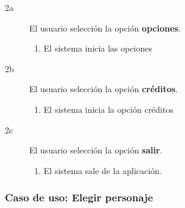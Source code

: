 \begin{description}
\begin{description}
            \item[2a ] El usuario selección la opción \textbf{opciones}.
            \begin{enumerate}
                \item El sistema inicia las opciones
            \end{enumerate}
            
            \item[2b ] El usuario selección la opción \textbf{créditos}.
            \begin{enumerate}
                \item El sistema inicia la opción créditos
            \end{enumerate}
            
            \item[2c ] El usuario selección la opción \textbf{salir}.
            \begin{enumerate}
                \item El sistema sale de la aplicación.
            \end{enumerate}
            
        \end{description}
\end{description}

\subsubsection{Caso de uso: Elegir personaje}

